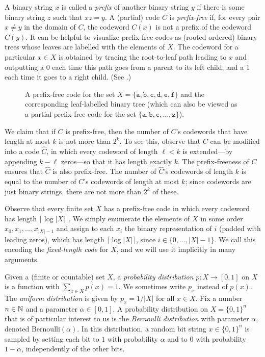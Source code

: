 \documentclass[prodmode,acmcsur]{acmsmall}
\begin{document}
A binary string
$x$ is called a \emph{prefix} of another binary string $y$ if there
is some binary string $z$ such that $xz = y$. A (partial) code $C$
is \emph{prefix-free} if, for every pair $x\neq y$ in the domain of
$C$, the codeword $C(x)$ is not a prefix of the codeword $C(y)$.  It can be
helpful to visualize prefix-free
codes as (rooted ordered) binary trees whose leaves are labelled with
the elements of $X$.  The codeword for a particular
$x\in X$ is obtained by tracing the root-to-leaf path leading to $x$
and outputting a 0 each time this path goes from a parent to its left
child, and a 1 each time it goes to a right child. (See
.)

\begin{figure}
  \caption{A prefix-free code for the set
    $X=\{\mathtt{a},\mathtt{b},\mathtt{c},\mathtt{d},\mathtt{e},\mathtt{f}\}$
    and the corresponding leaf-labelled binary tree (which can also be
    viewed as a partial prefix-free code for the set
    $\{\mathtt{a},\mathtt{b},\mathtt{c},\ldots,\mathtt{z}\}$).}
\end{figure}

We claim that if $C$ is prefix-free, then the
number of $C$'s codewords that have length at most $k$ is not more
than $2^k$. To see this, observe that $C$ can be
modified into a code $\widehat C$, in which every codeword of length
$\ell <k$ is extended---by appending $k-\ell$ zeros---so that it has
length exactly $k$. The prefix-freeness of $C$ ensures that $\widehat C$
is also prefix-free. The number of $\widehat C$'s codewords of
length $k$ is equal to the number of $C$'s codewords of length at
most $k$; since codewords are just binary strings, there are not more
than $2^k$ of these.

Observe that every finite set $X$ has a prefix-free code in which
every codeword has length $\lceil\log |X|\rceil$. We simply enumerate
the elements of $X$ in some order $x_0,x_1,\ldots,x_{|X|-1}$ and
assign to each $x_i$ the binary representation of $i$ (padded with
leading zeros), which has length $\lceil\log |X|\rceil$, since
$i\in\{0,\ldots,|X|-1\}$.  We call this encoding the \emph{fixed-length
code} for $X$, and we will use it implicitly in many arguments.

Given a (finite or countable) set $X$, a \emph{probability distribution} 
$p: X \rightarrow [0,1]$ on $X$ is a function with
$\sum_{x \in X} p(x) = 1$. We sometimes write $p_x$
instead of $p(x)$. 
The \emph{uniform distribution} is given by $p_x = 1/|X|$ for
all $x \in X$.
Fix a number $n \in \mathbb{N}$ and a
parameter $\alpha \in [0,1]$.
A probability distribution on $X = \{0, 1\}^n$
that is of particular interest to us is the \emph{Bernoulli
distribution} with parameter $\alpha$, denoted 
$\mathrm{Bernoulli}(\alpha)$. In this distribution, a
random bit string $x \in \{0, 1\}^n$ is sampled by setting each bit
to $1$ with probability $\alpha$ and to $0$ with probability $1-\alpha$,
independently of the other bits.
\end{document}
